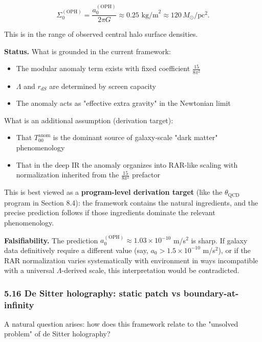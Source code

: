 \[
\Sigma_0^{\mathrm{(OPH)}} = \frac{a_0^{\mathrm{(OPH)}}}{2\pi G}
\approx 0.25 \text{ kg/m}^2 \approx 120 \, M_\odot/\text{pc}^2.
\]

This is in the range of observed central halo surface densities.

\textbf{Status.} What is grounded in the current framework:

\begin{itemize}
\tightlist
\item
  The modular anomaly term exists with fixed coefficient \(\frac{15}{8\pi^2}\)
\item
  \(\Lambda\) and \(r_{dS}\) are determined by screen capacity
\item
  The anomaly acts as "effective extra gravity" in the Newtonian limit
\end{itemize}

What is an additional assumption (derivation target):

\begin{itemize}
\tightlist
\item
  That \(T_{00}^{\mathrm{anom}}\) is the dominant source of galaxy-scale "dark matter" phenomenology
\item
  That in the deep IR the anomaly organizes into RAR-like scaling with normalization inherited from the \(\frac{15}{8\pi^2}\) prefactor
\end{itemize}

This is best viewed as a \textbf{program-level derivation target} (like the \(\theta_{\mathrm{QCD}}\) program in Section 8.4): the framework contains the natural ingredients, and the precise prediction follows if those ingredients dominate the relevant phenomenology.

\textbf{Falsifiability.} The prediction \(a_0^{\mathrm{(OPH)}} \approx 1.03 \times
10^{-10}\) m/s\(^2\) is sharp. If galaxy data definitively require a different value (say, \(a_0 > 1.5 \times 10^{-10}\) m/s\(^2\)), or if the RAR normalization varies systematically with environment in ways incompatible with a universal \(\Lambda\)-derived scale, this interpretation would be contradicted.

\subsubsection{5.16 De Sitter holography: static patch vs boundary-at-infinity}\label{516-de-sitter-holography-static-patch-vs-boundary-at-infinity}

A natural question arises: how does this framework relate to the "unsolved problem" of de Sitter holography?

